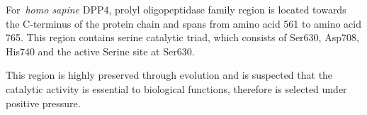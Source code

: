 For~\textit{homo sapine} DPP4, prolyl oligopeptidase family region is located towards the C-terminus of the protein chain and spans from amino acid 561 to amino acid 765. This region contains serine catalytic triad, which consists of Ser630, Asp708, His740 and the active Serine site at Ser630. \par
This region is highly preserved through evolution and is suspected that the catalytic activity is essential to biological functions, therefore is selected under positive pressure. 